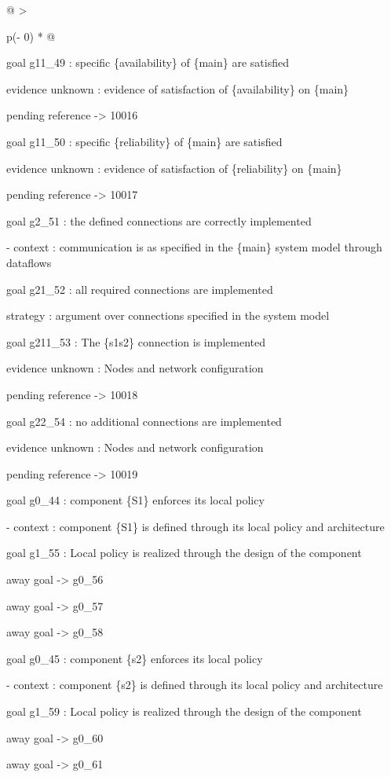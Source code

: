 \documentclass[12pt,twoside,a4paper]{article}
\begin{document}
\begin{longtable}[]{@{}
  >{\raggedright\arraybackslash}p{(\columnwidth - 0\tabcolsep) * }@{}}
\begin{minipage}[b]{\linewidth}
goal g11\_49 : specific \{availability\} of \{main\} are satisfied

evidence unknown : evidence of satisfaction of \{availability\} on \{main\}

pending reference -\textgreater{} 10016

goal g11\_50 : specific \{reliability\} of \{main\} are satisfied

evidence unknown : evidence of satisfaction of \{reliability\} on \{main\}

pending reference -\textgreater{} 10017

goal g2\_51 : the defined connections are correctly implemented

- context : communication is as specified in the \{main\} system model through dataflows

goal g21\_52 : all required connections are implemented

strategy : argument over connections specified in the system model

goal g211\_53 : The \{s1s2\} connection is implemented

evidence unknown : Nodes and network configuration

pending reference -\textgreater{} 10018

goal g22\_54 : no additional connections are implemented

evidence unknown : Nodes and network configuration

pending reference -\textgreater{} 10019

goal g0\_44 : component \{S1\} enforces its local policy

- context : component \{S1\} is defined through its local policy and architecture

goal g1\_55 : Local policy is realized through the design of the component

away goal -\textgreater{} g0\_56

away goal -\textgreater{} g0\_57

away goal -\textgreater{} g0\_58

goal g0\_45 : component \{s2\} enforces its local policy

- context : component \{s2\} is defined through its local policy and architecture

goal g1\_59 : Local policy is realized through the design of the component

away goal -\textgreater{} g0\_60

away goal -\textgreater{} g0\_61


\end{minipage}
\end{longtable}
\end{document}
